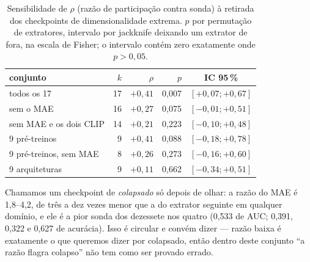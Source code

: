 \documentclass{esannV2}
\begin{document}
\begin{table}[t]
\centering\small
\setlength{\tabcolsep}{4pt}
\begin{tabular}{@{}lrrrc@{}}
\toprule
conjunto & $k$ & $\rho$ & $p$ & IC 95\,\% \\
\midrule
todos os 17 & 17 & $+0{,}41$ & 0,007 & $[+0{,}07; +0{,}67]$ \\
sem o MAE & 16 & $+0{,}27$ & 0,075 & $[-0{,}01; +0{,}51]$ \\
sem MAE e os dois CLIP & 14 & $+0{,}21$ & 0,223 & $[-0{,}10; +0{,}48]$ \\
\midrule
9 pré-treinos & 9 & $+0{,}41$ & 0,088 & $[-0{,}18; +0{,}78]$ \\
9 pré-treinos, sem MAE & 8 & $+0{,}26$ & 0,273 & $[-0{,}16; +0{,}60]$ \\
9 arquiteturas & 9 & $+0{,}11$ & 0,662 & $[-0{,}34; +0{,}51]$ \\
\bottomrule
\end{tabular}
\caption{Sensibilidade de $\rho$ (razão de participação contra sonda) à
retirada dos checkpoints de dimensionalidade extrema. $p$ por permutação de
extratores, intervalo por jackknife deixando um extrator de fora, na escala de
Fisher; o intervalo contém zero exatamente onde $p > 0{,}05$.}
\label{tab:sens}
\end{table}

Chamamos um checkpoint de \emph{colapsado} só depois de olhar: a razão do MAE
é 1,8--4,2, de três a dez vezes menor que a do extrator seguinte em qualquer
domínio, e ele é a pior sonda dos dezessete nos quatro (0,533 de AUC; 0,391,
0,322 e 0,627 de acurácia). Isso é circular e convém dizer --- razão baixa é
exatamente o que queremos dizer por colapsado, então dentro deste conjunto ``a
razão flagra colapso'' não tem como ser provado errado.
\end{document}
